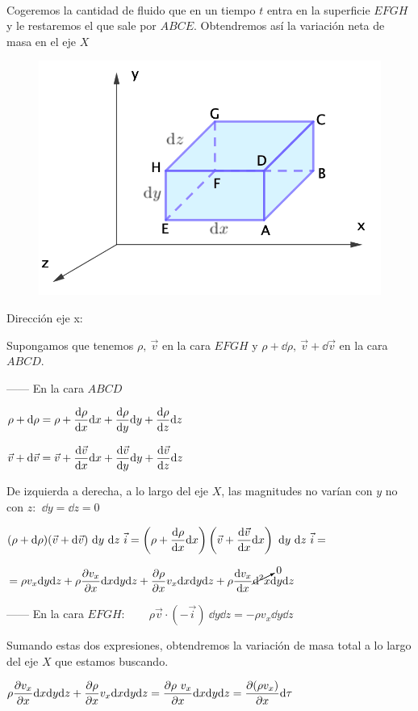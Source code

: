 \begin{multicols}{2}
$\quad$

Cogeremos la cantidad de fluido que en un tiempo $t$ entra en la superficie $EFGH$ y le restaremos el que sale por $ABCE$. Obtendremos así la variación neta de masa en el eje $X$
\begin{figure}[H]
	\centering
	\includegraphics[width=.5\textwidth]{imagenes/imagenes18/T18IM05.png}
	\end{figure}
\end{multicols}

Dirección eje x: 

Supongamos que tenemos $\rho, \ \vec v$ en la cara $EFGH$ y $\rho+\dd \rho,\ \vec v+\dd \vec v$ en la cara $ABCD$.

------ En la cara $ABCD$

$\displaystyle \rho + \dd \rho=\rho +\dv{\rho}{x}\dd x+\dv{\rho}{y}\dd y+\dv{\rho}{z}\dd z$

$\displaystyle \vec v + \dd \vec v= \vec v + \dv{\vec v}{x}\dd x+\dv{\vec v}{y}\dd y+\dv{\vec v}{z}\dd z$

De izquierda a derecha, a lo largo del eje $X$, las magnitudes no varían con $y$ no con $z$: $\ \dd y=\dd z=0$

$\displaystyle (\rho+\dd \rho) (\vec v+\dd \vec v)\ \dd y \ \dd z \ \vec i=
\left(\rho+\dv{\rho}{x} \dd x \right) \left(\vec v+\dv{\vec v}{x}\dd x \right)\ \dd y \ \dd z \ \vec i=$

$=\displaystyle \rho v_x \dd y \dd z+\rho \pdv{v_x}{x} \dd x \dd y \dd z + \pdv{\rho}{x}v_x \dd x \dd y \dd z + \rho \dv{v_x}{x} \cancelto{0}{\dd^2 x} \dd y \dd z $

------ En la cara $EFGH: \qquad \rho \vec v \cdot (-\vec i) \ \dd y \dd z=-\rho v_x \dd y \dd z$

Sumando estas dos expresiones, obtendremos la variación de masa total a lo largo del eje $X$ que estamos buscando.

$\displaystyle \rho \pdv{v_x}{x} \dd x \dd y \dd z + \pdv{\rho}{x}v_x \dd x \dd y \dd z  =\pdv{\rho\ v_x}{x} \dd x \dd y \dd z=\pdv{(\rho v_x)}{x} \dd \tau$

